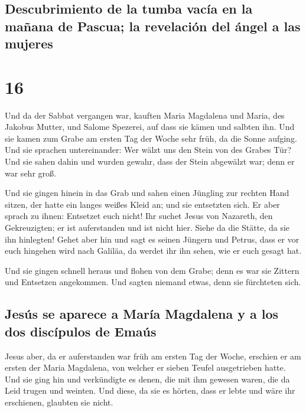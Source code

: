 \hypertarget{descubrimiento-de-la-tumba-vacuxeda-en-la-mauxf1ana-de-pascua-la-revelaciuxf3n-del-uxe1ngel-a-las-mujeres}{%
\subsection{Descubrimiento de la tumba vacía en la mañana de Pascua; la
revelación del ángel a las
mujeres}\label{descubrimiento-de-la-tumba-vacuxeda-en-la-mauxf1ana-de-pascua-la-revelaciuxf3n-del-uxe1ngel-a-las-mujeres}}

\hypertarget{section-15}{%
\section{16}\label{section-15}}

 Und da der Sabbat vergangen war, kauften Maria Magdalena
und Maria, des Jakobus Mutter, und Salome Spezerei, auf dass sie kämen
und salbten ihn.  Und sie kamen zum Grabe am ersten Tag
der Woche sehr früh, da die Sonne aufging.  Und sie
sprachen untereinander: Wer wälzt uns den Stein von des Grabes Tür?
 Und sie sahen dahin und wurden gewahr, dass der Stein
abgewälzt war; denn er war sehr groß.

 Und sie gingen hinein in das Grab und sahen einen
Jüngling zur rechten Hand sitzen, der hatte ein langes weißes Kleid an;
und sie entsetzten sich.  Er aber sprach zu ihnen:
Entsetzet euch nicht! Ihr suchet Jesus von Nazareth, den Gekreuzigten;
er ist auferstanden und ist nicht hier. Siehe da die Stätte, da sie ihn
hinlegten!  Gehet aber hin und sagt es seinen Jüngern und
Petrus, dass er vor euch hingehen wird nach Galiläa, da werdet ihr ihn
sehen, wie er euch gesagt hat.

 Und sie gingen schnell heraus und flohen von dem Grabe;
denn es war sie Zittern und Entsetzen angekommen. Und sagten niemand
etwas, denn sie fürchteten sich.

\hypertarget{jesuxfas-se-aparece-a-maruxeda-magdalena-y-a-los-dos-discuxedpulos-de-emauxfas}{%
\subsection{Jesús se aparece a María Magdalena y a los dos discípulos de
Emaús}\label{jesuxfas-se-aparece-a-maruxeda-magdalena-y-a-los-dos-discuxedpulos-de-emauxfas}}

 Jesus aber, da er auferstanden war früh am ersten Tag der
Woche, erschien er am ersten der Maria Magdalena, von welcher er sieben
Teufel ausgetrieben hatte.  Und sie ging hin und
verkündigte es denen, die mit ihm gewesen waren, die da Leid trugen und
weinten.  Und diese, da sie es hörten, dass er lebte und
wäre ihr erschienen, glaubten sie nicht.

